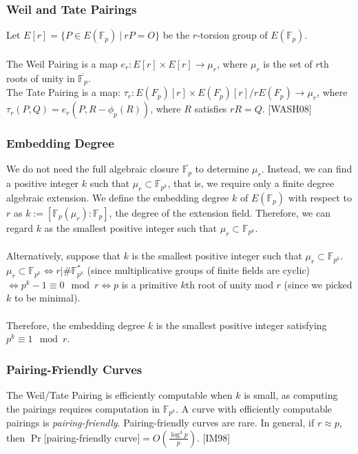 \documentclass[12pt,twoside]{article}
\newcommand\given[1][]{\:#1\vert\:}
\begin{document}
\subsubsection{Weil and Tate Pairings}
Let $E[r] = \{ P \in E(\mathbb F_p) \given rP = O\}$ be the $r$-torsion group of $E(\mathbb F_p)$.
\\ \\
\noindent The Weil Pairing is a map $e_r: E[r] \times E[r] \to \mu_r$, where $\mu_{r}$ is the set of $r$th roots of unity in $\overline{\mathbb F_p}$. \\ 

\noindent The Tate Pairing is a map: $\tau_r: E(F_p)[r] \times E(F_p)[r]/ rE(F_p) \to \mu_r$, where $\tau_r(P,Q) = e_r(P, R - \phi_p(R))$, where $R$ satisfies $r R = Q$. [WASH08]



 \subsubsection{Embedding Degree}
 
We do not need the full algebraic closure $\overline{\mathbb F_p}$ to determine $\mu_r$. Instead, we can find a positive integer $k$ such that $\mu_r \subset \mathbb F_{p^k}$, that is, we require only a finite degree algebraic extension. We define the embedding degree $k$ of $E(\mathbb F_p)$ with respect to $r$ as $k:= [\mathbb F_p(\mu_r) : \mathbb F_p]$, the degree of the extension field. Therefore, we can regard $k$ as the smallest positive integer such that $\mu_r \subset \mathbb F_{p^k}$.
\\ \\
\noindent Alternatively, suppose that $k$ is the smallest positive integer such that $\mu_r \subset \mathbb F_{p^k}$.  $\mu_r \subset \mathbb F_{p^k} \iff r \Big |  \# \mathbb F^*_{p^k}$ (since multiplicative groups of finite fields are cyclic) $ \iff p^k-1 \equiv 0 \mod r \iff p$ is a primitive $k$th root of unity mod $r$ (since we picked $k$ to be minimal). 
\\ \\
\noindent Therefore, the embedding degree $k$ is the smallest positive integer satisfying $p^k \equiv 1 \mod r$.

\subsubsection{Pairing-Friendly Curves}
The Weil/Tate Pairing is efficiently computable when $k$ is small, as computing the pairings requires computation in $\mathbb F_{p^k}$. A curve with efficiently computable pairings is {\it pairing-friendly}. Pairing-friendly curves are rare. In general, if $r \approx p$, then $\Pr[$pairing-friendly curve$] = O(\frac{\log^3 p}{p})$. [IM98]
\end{document}
